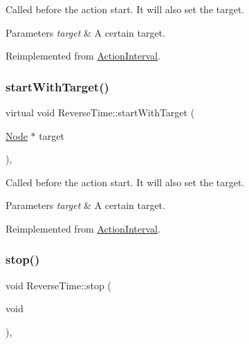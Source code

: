 Called before the action start. It will also set the target.


\begin{DoxyParams}{Parameters}
{\em target} & A certain target. \\
\hline
\end{DoxyParams}


Reimplemented from \hyperlink{classActionInterval_ad3d91186b2c3108488ddbbdbbd982484}{Action\+Interval}.

\mbox{\label{classReverseTime_affe557858b9401f25a00e9edb70738d6}} 
\subsubsection{\texorpdfstring{start\+With\+Target()}{startWithTarget()}\hspace{0.1cm}{\footnotesize\ttfamily [2/2]}}
{\footnotesize\ttfamily virtual void Reverse\+Time\+::start\+With\+Target (\begin{DoxyParamCaption}\item[{\hyperlink{classNode}{Node} $\ast$}]{target }\end{DoxyParamCaption})\hspace{0.3cm}{\ttfamily [override]}, {\ttfamily [virtual]}}

Called before the action start. It will also set the target.


\begin{DoxyParams}{Parameters}
{\em target} & A certain target. \\
\hline
\end{DoxyParams}


Reimplemented from \hyperlink{classActionInterval_ad3d91186b2c3108488ddbbdbbd982484}{Action\+Interval}.

\mbox{\label{classReverseTime_af59bd73c03add3be189a371f5f338b72}} 
\subsubsection{\texorpdfstring{stop()}{stop()}\hspace{0.1cm}{\footnotesize\ttfamily [1/2]}}
{\footnotesize\ttfamily void Reverse\+Time\+::stop (\begin{DoxyParamCaption}\item[{void}]{ }\end{DoxyParamCaption})\hspace{0.3cm}{\ttfamily [override]}, {\ttfamily [virtual]}}

